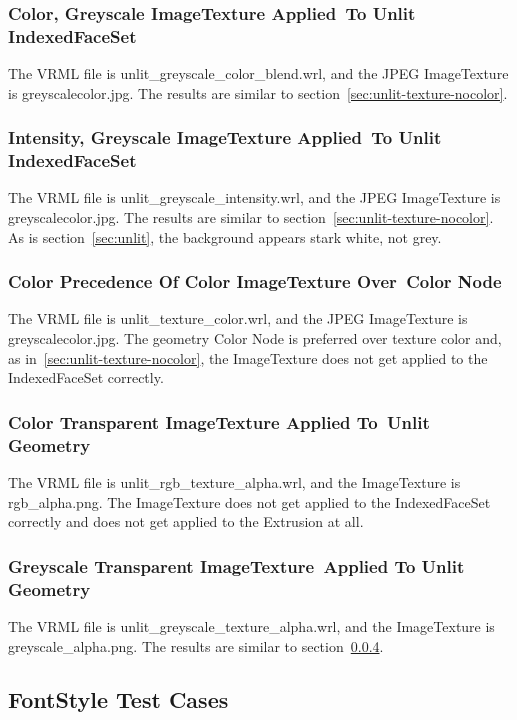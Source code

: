 \documentclass[12pt,letterpaper]{article}
\newcommand{\AppHa}{Color, Greyscale ImageTexture Applied~}
\newcommand{\AppHb}{To Unlit IndexedFaceSet}
\newcommand{\AppIa}{Intensity, Greyscale ImageTexture Applied~}
\newcommand{\AppIb}{To Unlit IndexedFaceSet}
\newcommand{\AppJa}{Color Precedence Of Color ImageTexture Over~}
\newcommand{\AppJb}{Color Node}
\newcommand{\AppKa}{Color Transparent ImageTexture Applied To~}
\newcommand{\AppKb}{Unlit Geometry}
\newcommand{\AppLa}{Greyscale Transparent ImageTexture~}
\newcommand{\AppLb}{Applied To Unlit Geometry}
\begin{document}
\subsubsection{\AppHa\AppHb}
The VRML file is unlit\_greyscale\_color\_blend.wrl, and the JPEG ImageTexture
is greyscalecolor.jpg.\newline
The results are similar to section~\ref{sec:unlit-texture-nocolor}.

\subsubsection{\AppIa\AppIb}
The VRML file is unlit\_greyscale\_intensity.wrl, and the JPEG ImageTexture
is greyscalecolor.jpg.\newline
The results are similar to section~\ref{sec:unlit-texture-nocolor}.
As is section~\ref{sec:unlit}, the background appears stark white, not grey.

\subsubsection{\AppJa\AppJb}
The VRML file is unlit\_texture\_color.wrl, and the JPEG ImageTexture
is greyscalecolor.jpg.\newline
The geometry Color Node is preferred over texture color and, as
in~\ref{sec:unlit-texture-nocolor}, the ImageTexture does not get
applied to the IndexedFaceSet correctly.

\subsubsection{\AppKa\AppKb}
\label{sec:unlit-rgb-texture}
The VRML file is unlit\_rgb\_texture\_alpha.wrl, and the ImageTexture
is rgb\_alpha.png.\newline
The ImageTexture does not get applied to the IndexedFaceSet correctly
and does not get applied to the Extrusion at all.

\subsubsection{\AppLa\AppLb}
The VRML file is unlit\_greyscale\_texture\_alpha.wrl, and the ImageTexture
is greyscale\_alpha.png.\newline
The results are similar to section~\ref{sec:unlit-rgb-texture}.

\subsection{FontStyle Test Cases}
\end{document}
